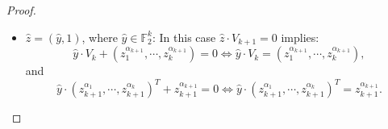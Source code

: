\documentclass[11pt]{llncs}
\begin{document}
\begin{proof}
\begin{itemize}
\begin{itemize}
\begin{itemize}
\item \( \hat{z} = (\hat{y}, 1) \), where \( \hat{y} \in \mathbb{F}_2^k \):          
In this case $\hat{z} \cdot V_{k+1} = 0$ implies:
\begin{equation}\label{Eq:eq1}
 \hat{y}  \cdot V_{k} + (z_{1}^{\alpha_{k+1}}, \cdots, z_{k}^{\alpha_{k+1}}) = 0 \iff \hat{y} \cdot V_{k} = (z_{1}^{\alpha_{k+1}}, \cdots, z_{k}^{\alpha_{k+1}}),
\end{equation}
and 
\begin{equation}\label{Eq:eq2}
\hat{y} \cdot (z_{k+1}^{\alpha_1}, \cdots, z_{k+1}^{\alpha_k})^T + z_{k+1}^{\alpha_{k+1}} = 0 \iff \hat{y} \cdot (z_{k+1}^{\alpha_1}, \cdots, z_{k+1}^{\alpha_k})^T = z_{k+1}^{\alpha_{k+1}}.
\end{equation}	
        \end{itemize}
            

\end{itemize}
\end{itemize}
\end{proof}
\end{document}
